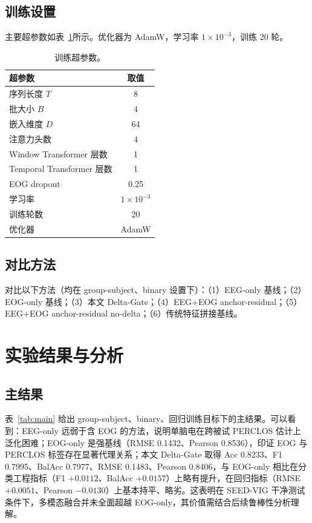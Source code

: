 \documentclass[11pt,a4paper]{ctexart}
\begin{document}
\subsection{训练设置}
主要超参数如表~\ref{tab:hyper}所示。优化器为 AdamW，学习率 $1\times10^{-3}$，训练 20 轮。

\begin{table}[h]
\centering
\caption{训练超参数。}
\label{tab:hyper}
\begin{tabular}{lc}
\toprule
超参数 & 取值 \\
\midrule
序列长度 $T$ & 8 \\
批大小 $B$ & 4 \\
嵌入维度 $D$ & 64 \\
注意力头数 & 4 \\
Window Transformer 层数 & 1 \\
Temporal Transformer 层数 & 1 \\
EOG dropout & 0.25 \\
学习率 & $1\times10^{-3}$ \\
训练轮数 & 20 \\
优化器 & AdamW \\
\bottomrule
\end{tabular}
\end{table}

\subsection{对比方法}
对比以下方法（均在 group-subject、binary 设置下）：（1）EEG-only 基线；（2）EOG-only 基线；（3）本文 Delta-Gate；（4）EEG+EOG anchor-residual；（5）EEG+EOG anchor-residual no-delta；（6）传统特征拼接基线。

\section{实验结果与分析}

\subsection{主结果}
表~\ref{tab:main} 给出 group-subject、binary、回归训练目标下的主结果。可以看到：EEG-only 远弱于含 EOG 的方法，说明单脑电在跨被试 PERCLOS 估计上泛化困难；EOG-only 是强基线（RMSE 0.1432、Pearson 0.8536），印证 EOG 与 PERCLOS 标签存在显著代理关系；本文 Delta-Gate 取得 Acc 0.8233、F1 0.7995、BalAcc 0.7977、RMSE 0.1483、Pearson 0.8406，与 EOG-only 相比在分类工程指标（F1 $+0.0112$、BalAcc $+0.0157$）上略有提升，在回归指标（RMSE $+0.0051$、Pearson $-0.0130$）上基本持平、略劣。这表明在 SEED-VIG 干净测试条件下，多模态融合并未全面超越 EOG-only，其价值需结合后续鲁棒性分析理解。
\end{document}

